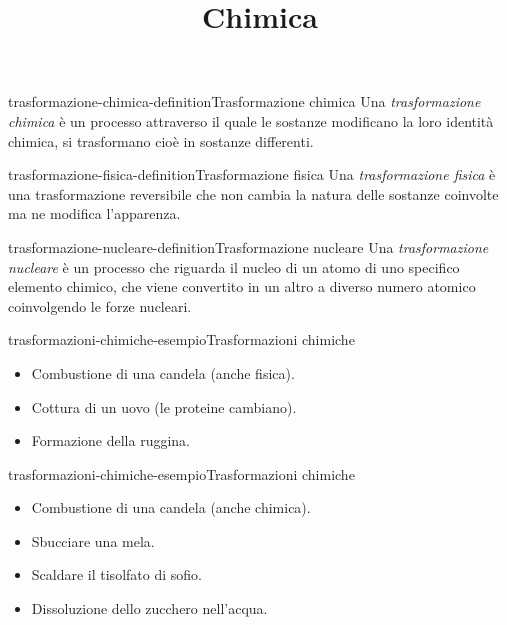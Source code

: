 \documentclass[preview]{standalone}
\begin{document}
\title{Chimica}
\genpage


\begin{snippetdefinition}{trasformazione-chimica-definition}{Trasformazione chimica}
    Una \textit{trasformazione chimica}
    è un processo attraverso il quale le sostanze modificano la loro identità chimica,
    si trasformano cioè in sostanze differenti.
\end{snippetdefinition}

\begin{snippetdefinition}{trasformazione-fisica-definition}{Trasformazione fisica}
    Una \textit{trasformazione fisica} è una trasformazione reversibile
    che non cambia la natura delle sostanze coinvolte ma ne modifica l'apparenza.
\end{snippetdefinition}

\begin{snippetdefinition}{trasformazione-nucleare-definition}{Trasformazione nucleare}
    Una \textit{trasformazione nucleare}
    è un processo che riguarda il nucleo di un atomo di uno specifico elemento chimico,
    che viene convertito in un altro a diverso numero atomico coinvolgendo le forze nucleari.
\end{snippetdefinition}

\begin{snippetexample}{trasformazioni-chimiche-esempio}{Trasformazioni chimiche}
    \begin{itemize}
        \item Combustione di una candela (anche fisica).
        \item Cottura di un uovo (le proteine cambiano).
        \item Formazione della ruggina.
    \end{itemize}
\end{snippetexample}

\begin{snippetexample}{trasformazioni-chimiche-esempio}{Trasformazioni chimiche}
    \begin{itemize}
        \item Combustione di una candela (anche chimica).
        \item Sbucciare una mela.
        \item Scaldare il tisolfato di sofio.
        \item Dissoluzione dello zucchero nell'acqua.
    \end{itemize}
\end{snippetexample}
\end{document}
